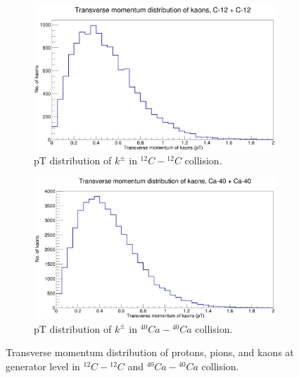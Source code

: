 \documentclass[12pt, twocolumn]{article}
\begin{document}
\begin{figure}[h]
\begin{subfigure}[h]{0.49\textwidth}
\includegraphics[scale=0.14]{pT_kaons_C12.png}
\caption{pT distribution of $k^{\pm}$ in $^{12}C-{^{12}C}$ collision.}
\label{Generator - Transverse momentum distribution of kaons C12.}
\end{subfigure}
\hfill
\begin{subfigure}[h]{0.49\textwidth}
\centering
\includegraphics[scale=0.14]{pT_kaons_Ca.png}
\caption{pT distribution of $k^{\pm}$ in $^{40}Ca-{^{40}Ca}$ collision.}
\label{Generator - Transverse momentum distribution of kaons Ca40.}
\end{subfigure}
\caption{Transverse momentum distribution of protons, pions, and kaons at generator level in $^{12}C-{^{12}C}$ and $^{40}Ca-{^{40}Ca}$ collision.}
\label{Transverse momentum distribution of protons, pions, and kaons at generator level in C12-C12 and Ca-Ca40 collision.}
\end{figure}

\clearpage
\end{document}
